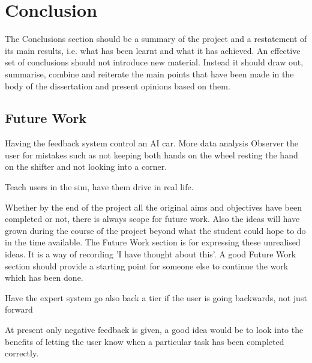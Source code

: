\chapter{Conclusion}
The Conclusions section should be a summary of the project and a restatement of its main results,
i.e. what has been learnt and what it has achieved. An effective set of conclusions should not
introduce new material. Instead it should draw out, summarise, combine and reiterate the main
points that have been made in the body of the dissertation and present opinions based on them. 

\section{Future Work}

Having the feedback system control an AI car.
More data analysis
Observer the user for mistakes such as not keeping both hands on the wheel resting the hand on the shifter and not looking into a corner.

Teach users in the sim, have them drive in real life.

Whether by the end of the project all the original aims and objectives have been completed or not,
there is always scope for future work. Also the ideas will have grown during the course of the project
beyond what the student could hope to do in the time available. The Future Work section is for
expressing these unrealised ideas. It is a way of recording 'I have thought about this'. A good Future
Work section should provide a starting point for someone else to continue the work which has been
done. 

Have the expert system go also back a tier if the user is going backwards, not just forward

At present only negative feedback is given, a good idea would be to look into the benefits of letting the user know when a particular task has been completed correctly.